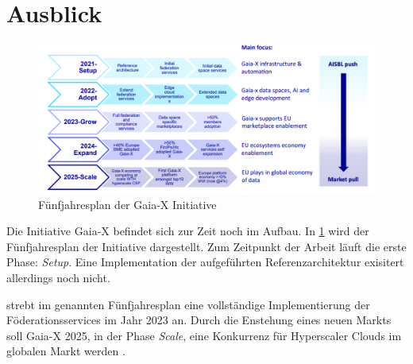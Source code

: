 \section{Ausblick}
\label{sec:fazit_ausblick:fazit}

\begin{figure}[h]
  \centering
  \includegraphics[width=1.1\textwidth]{gfx/chapters/6_fazit_ausblick/gaia-x-ausblick.png}
  \caption{Fünfjahresplan der Gaia-X Initiative}
  \label{fig:gaia-x-ausblick}
\end{figure}

Die Initiative Gaia-X befindet sich zur Zeit noch im Aufbau.
In \ref{fig:gaia-x-ausblick} wird der Fünfjahresplan der Initiative dargestellt.
Zum Zeitpunkt der Arbeit läuft die erste Phase: \emph{Setup}.
Eine Implementation der aufgeführten Referenzarchitektur exisitert allerdings noch nicht.

\citeauthor{Bonfiglio2021} strebt im genannten Fünfjahresplan eine vollständige Implementierung der Föderationsservices
im Jahr 2023 an.
Durch die Enstehung eines neuen Markts soll Gaia-X 2025, in der Phase \emph{Scale},
eine Konkurrenz für Hyperscaler Clouds im globalen Markt werden \cite{Bonfiglio2021}.